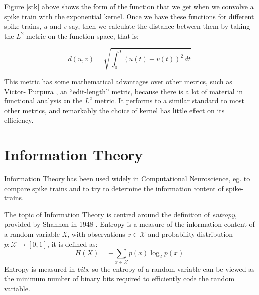 
Figure \ref{stk} above shows the form of the function that we get when we 
convolve a spike train with the exponential kernel.  Once we have these 
functions for different spike trains, $u$ and $v$ say, then we calculate the 
distance between them by taking the $L^2$ metric on the function space, that is:

\begin{equation}
d(u,v) = \sqrt{\int_0^T (u(t) - v(t))^2\,dt}
\end{equation}



This metric has some mathematical advantages over other metrics, such as Victor-
Purpura \cite{VictorPurpura1997a}, an ``edit-length'' metric, because there is 
a lot of material in functional analysis on the $L^2$ metric.  It performs to a 
similar standard to most other metrics, and remarkably the choice of kernel has 
little effect on its efficiency.

\section{Information Theory}
Information Theory has been used widely in Computational Neuroscience, eg. to compare spike trains \cite{BialekEtAl1998a} and to try to determine the information content of spike-trains\cite{GillespieHoughton2009a}.

The topic of Information Theory is centred around the definition of \emph{entropy}, provided by Shannon in 1948 \cite{Shannon1948a}.  Entropy is a measure of the information content of a random variable $X$, with observations $x \in \mathcal{X}$ and probability distribution $p:\mathcal{X} \rightarrow [0,1]$, it is defined as:
\begin{equation}
H(X) = -\sum_{x\in\mathcal{X}}  p(x) \log_2 p(x)
\end{equation}
Entropy is measured in \emph{bits}, so the entropy of a random variable can be viewed as the minimum number of binary bits required to efficiently code the random variable.